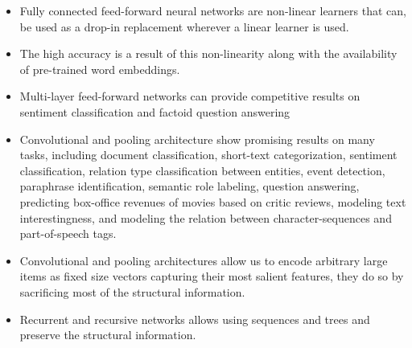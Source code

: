 \documentclass[parskip=half]{scrartcl}
\begin{document}
    \begin{itemize}
        \item 
        Fully connected feed-forward neural networks are non-linear learners that can, be used as a drop-in replacement wherever a linear learner is used.
        \item 
        The high accuracy is a result of this non-linearity along with the availability of pre-trained word embeddings.
        \item 
        Multi-layer feed-forward networks can provide competitive results on sentiment classification and factoid question answering
        \item 
        Convolutional and pooling architecture show promising results on many tasks, including document classification, short-text categorization, sentiment classification, relation type classification between entities, event detection, paraphrase identification, semantic role labeling, question answering, predicting box-office revenues of movies based on critic reviews, modeling text interestingness, and modeling the relation between character-sequences and part-of-speech tags.
        \item 
        Convolutional and pooling architectures allow us to encode arbitrary large items as fixed size vectors capturing their most salient features, they do so by sacrificing most of the structural information.
        \item 
        Recurrent and recursive networks allows using sequences and trees and preserve the structural information.
    \end{itemize}





\end{document}
